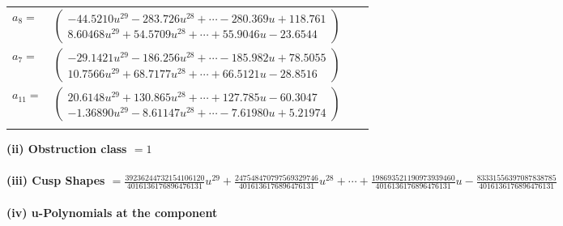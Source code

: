 \documentclass[1p]{elsarticle_modified}
\theoremstyle{definition}
\begin{document}
\begin{tabular}{m{7pt} m{180pt} m{7pt} m{180pt} }
\flushright $a_{8}=$&$\begin{pmatrix}-44.5210 u^{29}-283.726 u^{28}+\cdots-280.369 u+118.761\\8.60468 u^{29}+54.5709 u^{28}+\cdots+55.9046 u-23.6544\end{pmatrix}$ \\
\flushright $a_{7}=$&$\begin{pmatrix}-29.1421 u^{29}-186.256 u^{28}+\cdots-185.982 u+78.5055\\10.7566 u^{29}+68.7177 u^{28}+\cdots+66.5121 u-28.8516\end{pmatrix}$ \\
\flushright $a_{11}=$&$\begin{pmatrix}20.6148 u^{29}+130.865 u^{28}+\cdots+127.785 u-60.3047\\-1.36890 u^{29}-8.61147 u^{28}+\cdots-7.61980 u+5.21974\end{pmatrix}$\\&\end{tabular}
\flushleft \textbf{(ii) Obstruction class $= 1$}\\~\\
\flushleft \textbf{(iii) Cusp Shapes $= \frac{39236244732154106120}{4016136176896476131} u^{29}+\frac{247548470797569329746}{4016136176896476131} u^{28}+\cdots+\frac{198693521190973939460}{4016136176896476131} u-\frac{83331556397087838785}{4016136176896476131}$}\\~\\
\newpage\renewcommand{\arraystretch}{1}
\flushleft \textbf{(iv) u-Polynomials at the component}\newline \\
\end{document}
